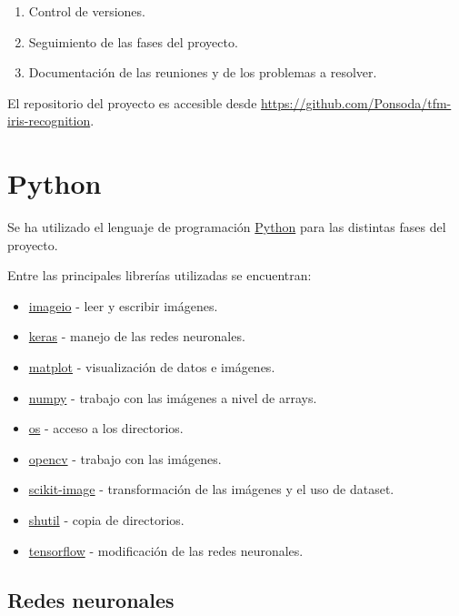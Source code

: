 \begin{enumerate}
    \item Control de versiones.
    \item Seguimiento de las fases del proyecto.
    \item Documentación de las reuniones y de los problemas a resolver.
\end{enumerate}

El repositorio del proyecto es accesible desde \url{https://github.com/Ponsoda/tfm-iris-recognition}.

\section{Python}

Se ha utilizado el lenguaje de programación \href{https://www.python.org/}{Python} para las distintas fases del proyecto.

Entre las principales librerías utilizadas se encuentran:

\begin{itemize}
    \item \href{https://imageio.readthedocs.io/en/stable/}{imageio} - leer y escribir imágenes.
    \item \href{https://keras.io/}{keras} - manejo de las redes neuronales.
    \item \href{https://matplotlib.org/}{matplot} - visualización de datos e imágenes.
    \item \href{https://numpy.org/}{numpy} - trabajo con las imágenes a nivel de arrays.
    \item \href{https://docs.python.org/3/library/os.html}{os} - acceso a los directorios.
    \item \href{https://opencv.org/}{opencv} - trabajo con las imágenes.
    \item \href{https://scikit-image.org/}{scikit-image} - transformación de las imágenes y el uso de dataset.
    \item \href{https://docs.python.org/3/library/shutil.html}{shutil} - copia de directorios.
    \item \href{https://www.tensorflow.org/}{tensorflow} - modificación de las redes neuronales.
\end{itemize}

\subsection{Redes neuronales}

